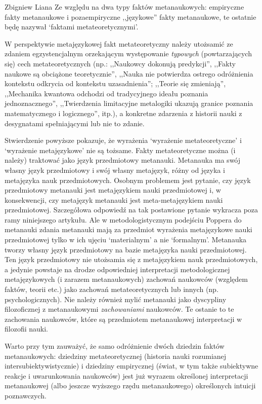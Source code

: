 \begin{artplenv}{Zbigniew Liana}
Ze względu na dwa typy faktów metanaukowych: empiryczne fakty metanaukowe i pozaempiryczne ,,językowe'' fakty metanaukowe,
te ostatnie będę nazywał ‘faktami metateoretycznymi’.

W perspektywie metajęzykowej fakt metateoretyczny należy utożsamić ze zdaniem egzystencjalnym orzekającym występowanie
\textit{typowych} (powtarzających się) cech metateoretycznych (np.: ,,Naukowcy dokonują predykcji'', ,,Fakty naukowe są
obciążone teoretycznie'', ,,Nauka nie potwierdza ostrego odróżnienia kontekstu odkrycia od kontekstu uzasadnienia'';
,,Teorie się zmieniają'', ,,Mechanika kwantowa odchodzi od tradycyjnego ideału poznania jednoznacznego'', ,,Twierdzenia
limitacyjne metalogiki ukazują granice poznania matematycznego i logicznego'', itp.), a konkretne zdarzenia z historii
nauki z desygnatami spełniającymi lub nie to zdanie. 

Stwierdzenie powyższe pokazuje, że wyrażenia ‘wyrażenie metateoretyczne’ i ‘wyrażenie metajęzykowe’ nie są tożsame.
Fakty metateoretyczne można (i należy) traktować jako język przedmiotowy metanauki. Metanauka ma swój własny język
przedmiotowy i swój własny metajęzyk, różny od języka i metajęzyka nauk przedmiotowych. Osobnym problemem jest pytanie,
czy język przedmiotowy metanauki jest metajęzykiem nauki przedmiotowej i, w konsekwencji, czy metajęzyk metanauki jest
meta-metajęzykiem nauki przedmiotowej. Szczegółowa odpowiedź na tak postawione pytanie wykracza poza ramy niniejszego
artykułu. Ale w metodologistycznym podejściu Poppera do metanauki zdania metanauki mają za przedmiot wyrażenia
metajęzykowe nauki przedmiotowej tylko w ich ujęciu ‘materialnym’ a nie ‘formalnym’. Metanauka tworzy własny język
przedmiotowy na bazie metajęzyka nauki przedmiotowej. Ten język przedmiotowy nie utożsamia się z metajęzykiem nauk
przedmiotowych, a jedynie powstaje na drodze odpowiedniej interpretacji metodologicznej metajęzykowych (i zarazem
metanaukowych) zachowań naukowców (względem faktów, teorii etc.) jako zachowań metateoretycznych lub innych (np.
psychologicznych). Nie należy również mylić metanauki jako dyscypliny filozoficznej z metanaukowymi \textit{zachowaniami}
naukowców. Te ostanie to te zachowania naukowców, które są przedmiotem metanaukowej interpretacji w filozofii nauki.

Warto przy tym zauważyć, że samo odróżnienie dwóch dziedzin faktów metanaukowych: dziedziny metateoretycznej (historia
nauki rozumianej intersubiektywistycznie) i dziedziny empirycznej (świat, w tym także subiektywne reakcje i
uwarunkowania naukowców) jest już wyrazem określonej interpretacji metanaukowej (albo jeszcze wyższego rzędu
metanaukowego) określonych intuicji poznawczych.


\end{artplenv}
